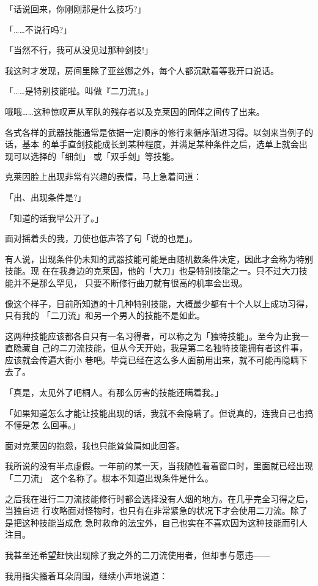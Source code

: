\documentclass[11pt]{book}
\begin{document}
「话说回来，你刚刚那是什么技巧?」

「……不说行吗?」

「当然不行，我可从没见过那种剑技!」

我这时才发现，房间里除了亚丝娜之外，每个人都沉默着等我开口说话。

「……是特别技能啦。叫做『二刀流』。」

哦哦……这种惊叹声从军队的残存者以及克莱因的同伴之间传了出来。

各式各样的武器技能通常是依据一定顺序的修行来循序渐进习得。以剑来当例子的话，基本
的单手直剑技能成长到某种程度，并满足某种条件之后，选单上就会出现可以选择的「细剑」
或「双手剑」等技能。

克莱因脸上出现非常有兴趣的表情，马上急着问道：

「出、出现条件是?」

「知道的话我早公开了。」

面对摇着头的我，刀使也低声答了句「说的也是」。

有人说，出现条件仍未知的武器技能可能是由随机数条件决定，因此才会称为特别技能。现
在在我身边的克莱因，他的「大刀」也是特别技能之一。只不过大刀技能并不是那么罕见，
只要不断修行曲刀就有很高的机率会出现。

像这个样子，目前所知道的十几种特别技能，大概最少都有十个人以上成功习得，只有我的
「二刀流」和另一个男人的技能不是如此。

这两种技能应该都各自只有一名习得者，可以称之为「独特技能」。至今为止我一直隐藏自
己的二刀流技能，但从今天开始，我是第二名独特技能拥有者这件事，应该就会传遍大街小
巷吧。毕竟已经在这么多人面前用出来，就不可能再隐瞒下去了。

「真是，太见外了吧桐人。有那么厉害的技能还瞒着我。」

「如果知道怎么才能让技能出现的话，我就不会隐瞒了。但说真的，连我自己也搞不懂是怎
么回事。」

面对克莱因的抱怨，我也只能耸耸肩如此回答。

我所说的没有半点虚假。一年前的某一天，当我随性看着窗口时，里面就已经出现「二刀流」
这个名称了。根本不知道出现条件是什么。

之后我在进行二刀流技能修行时都会选择没有人烟的地方。在几乎完全习得之后，当独自进
行攻略面对怪物时，也只有在非常紧急的状况下才会使用二刀流。除了是把这种技能当成危
急时救命的法宝外，自己也实在不喜欢因为这种技能而引人注目。

我甚至还希望赶快出现除了我之外的二刀流使用者，但却事与愿违——

我用指尖搔着耳朵周围，继续小声地说道：
\end{document}
